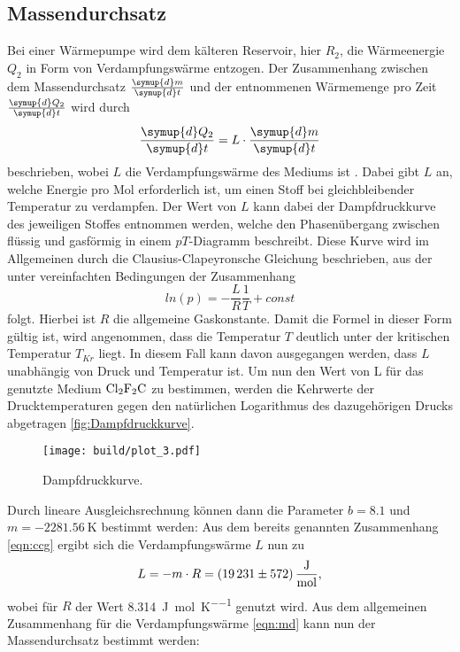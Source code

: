 \subsection{Massendurchsatz}
Bei einer Wärmepumpe wird dem kälteren Reservoir, hier $R_2$, die Wärmeenergie $Q_2$ in Form von Verdampfungswärme entzogen.
Der Zusammenhang zwischen dem Massendurchsatz $\frac{\symup{d} m}{\symup{d} t}$ und der entnommenen Wärmemenge pro Zeit $\frac{\symup{d} Q_2}{\symup{d} t}$ wird durch
\begin{equation}
  \frac{\symup{d} Q_2}{\symup{d}t} = L \cdot \frac{\symup{d} m}{\symup{d} t}
  \label{eqn:md}
\end{equation}
beschrieben, wobei $L$ die Verdampfungswärme des Mediums ist \cite{V203}.
Dabei gibt $L$ an, welche Energie pro Mol erforderlich ist, um einen Stoff bei gleichbleibender Temperatur zu verdampfen.
Der Wert von $L$ kann dabei der Dampfdruckkurve des jeweiligen Stoffes entnommen werden, welche den Phasenübergang zwischen flüssig und gasförmig in einem $pT$-Diagramm beschreibt.
Diese Kurve wird im Allgemeinen durch die Clausius-Clapeyronsche Gleichung beschrieben, aus der unter vereinfachten Bedingungen der Zusammenhang
\begin{equation}
  ln(p)= -\frac{L}{R}\frac{1}{T} + const
  \label{eqn:ccg}
\end{equation}
folgt.
Hierbei ist $R$ die allgemeine Gaskonstante.
Damit die Formel in dieser Form gültig ist, wird angenommen, dass die Temperatur $T$ deutlich unter der kritischen Temperatur $T_{Kr}$ liegt.
In diesem Fall kann davon ausgegangen werden, dass $L$ unabhängig von Druck und Temperatur ist.
Um nun den Wert von L für das genutzte Medium $\ce{Cl2F2C}$ zu bestimmen, werden die Kehrwerte der Drucktemperaturen gegen den natürlichen Logarithmus des dazugehörigen Drucks abgetragen \autoref{fig:Dampfdruckkurve}.
\begin{figure}[H]
  \centering
  \texttt{[image: build/plot\_3.pdf]}
  \caption{Dampfdruckkurve.}
  \label{fig:Dampfdruckkurve}
\end{figure}
\noindent Durch lineare Ausgleichsrechnung können dann die Parameter $b= \num{8.1}$ und $m= \SI{-2281.56}{\kelvin}$ bestimmt werden:
Aus dem bereits genannten Zusammenhang \eqref{eqn:ccg} ergibt sich die Verdampfungswärme $L$ nun zu
\begin{align*}
  L = -m \cdot R = \SI[per-mode=fraction]{19231 +- 572}{\joule\per\mol},
\end{align*}
wobei für $R$ der Wert \SI{8.314}{\joule\per\mol\per\kelvin} genutzt wird. \cite{codata}
Aus dem allgemeinen Zusammenhang für die Verdampfungswärme \eqref{eqn:md} kann nun der Massendurchsatz bestimmt werden:

